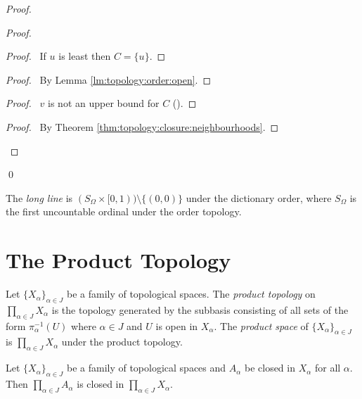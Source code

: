 \begin{proof}
  \pf
  \begin{proof}
    \begin{proof}
      \pf\ If $u$ is least then $C = \{ u \}$.
    \end{proof}
    \step{<2>3}{\pick\ $v < u$ such that $(v, u] \subseteq U$}
    \begin{proof}
      \pf\ By Lemma \ref{lm:topology:order:open}.
    \end{proof}
    \begin{proof}
      \pf\ $v$ is not an upper bound for $C$ ().
    \end{proof}
    \qedstep
    \begin{proof}
      \pf\ By Theorem \ref{thm:topology:closure:neighbourhoods}.
    \end{proof}
  \end{proof}
  \qed
\end{proof}

\begin{df}
  The \emph{long line} is $(S_\Omega \times [0, 1)) \setminus \{(0, 0)\}$
  under the dictionary
  order, where $S_\Omega$ is the first uncountable ordinal under the order
  topology.
\end{df}

\section{The Product Topology}

\begin{df}
  Let $\{ X_\alpha \}_{\alpha \in J}$ be a family of topological spaces. The
  \emph{product topology} on $\prod_{\alpha \in J} X_\alpha$ is the topology
  generated by the subbasis consisting of all sets of the form
  $\pi_\alpha^{-1}(U)$ where $\alpha \in J$ and $U$ is open in $X_\alpha$.
  The \emph{product space} of $\{ X_\alpha \}_{\alpha \in J}$ is
  $\prod_{\alpha \in J} X_\alpha$ under the product topology.
\end{df}

\begin{lm}
  Let $\{ X_\alpha \}_{\alpha \in J}$ be a family of topological spaces and
  $A_\alpha$ be closed in $X_\alpha$ for all $\alpha$. Then $\prod_{\alpha
    \in J} A_\alpha$ is closed in $\prod_{\alpha \in J} X_\alpha$.
\end{lm}

